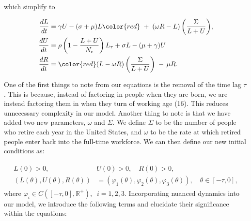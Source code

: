 \documentclass[11pt]{amsart}
\begin{document}
which simplify to 

\begin{align}
    \begin{split}
        \frac{dL}{dt} &= \gamma U - (\sigma + \mu)L {\color{red}\; + \;(\omega R - L)\left(\frac{\Sigma}{L + U}\right)},\\
        \frac{dU}{dt} &= \rho\left(1 - \frac{L + U}{N_c} \right)L_{\tau} + \sigma L -(\mu + \gamma)U  \\
        \frac{dR}{dt} &= {\color{red}(L - \omega R)\left(\frac{\Sigma}{L + U}\right) \; - \, \mu R}.
    \end{split}
\end{align}

One of the first things to note from our equations is the removal of the time lag $\tau$. 
This is because, instead of factoring in people when they are born, we are instead factoring them
in when they turn of working age (16). This reduces unnecessary complexity in our model. Another thing to note
is that we have added two new parameters, $\omega$ and $\Sigma$. We define $\Sigma$ to be the number of people who
retire each year in the United States, and $\omega$ to be the rate at which retired people enter back
into the full-time workforce. We can then define our new initial conditions as:

\begin{align}
    \begin{split}
        L(0) > 0, \quad &U(0) > 0, \quad R(0) > 0, \\
        (L(\theta),U(\theta), R(\theta)) &= (\varphi_1(\theta), \varphi_2(\theta), \varphi_3(\theta)), \quad \theta \in [-\tau,0],
    \end{split}
\end{align}
where $\varphi_i\in C([-\tau, 0], \mathbb{R}^+),\;\; i=1,2,3$. Incorporating nuanced dynamics into our model, we introduce the following terms and elucidate their significance within the equations:
\end{document}
